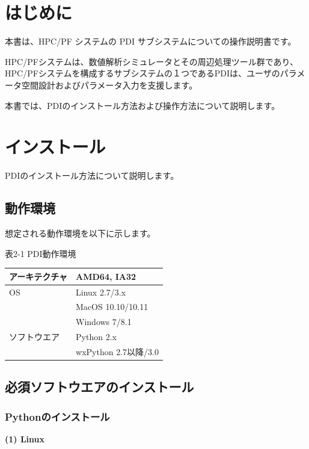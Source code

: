 \documentclass[a4paper,11pt]{jarticle}
\begin{document}
\newpage
\tableofcontents


\newpage
\section*{はじめに}

本書は、HPC/PF システムの PDI サブシステムについての操作説明書です。


HPC/PFシステムは、数値解析シミュレータとその周辺処理ツール群であり、HPC/PFシステムを構成するサブシステムの１つであるPDIは、ユーザのパラメータ空間設計およびパラメータ入力を支援します。


本書では、PDIのインストール方法および操作方法について説明します。

\newpage
\section{インストール}

\vspace{12pt}
PDIのインストール方法について説明します。

\subsection{動作環境}

想定される動作環境を以下に示します。

表2-1 PDI動作環境

\begin{tabular}{|l|l|}
\hline
アーキテクチャ & AMD64, IA32\\ \hline
OS & Linux 2.7/3.x\\
   & MacOS 10.10/10.11\\
   & Windows 7/8.1\\ \hline
ソフトウエア & Python 2.x\\
             & wxPython 2.7以降/3.0\\ \hline
\end{tabular}

\subsection{必須ソフトウエアのインストール}

\subsubsection{Pythonのインストール}

\textbf{(1) Linux}
\end{document}
